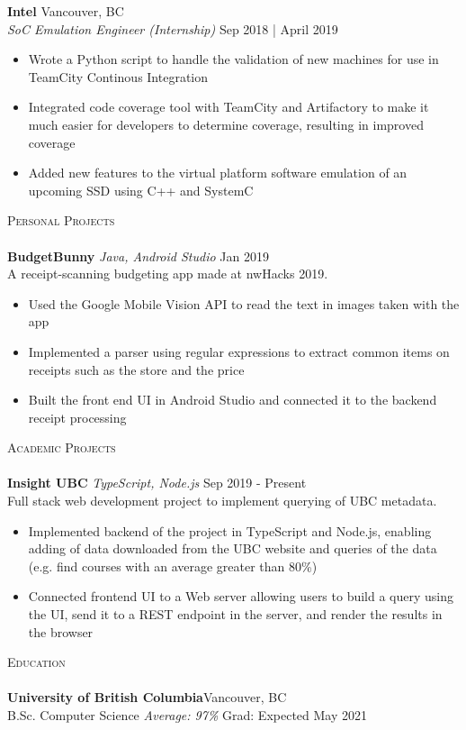 \documentclass[11pt, twoside]{article}
\newcommand{\lineunder} {
    \vspace*{-8pt} \\
    \hspace*{-18pt} \hrulefill \\
}
\newcommand{\header} [1] {
    {\hspace*{-18pt}\vspace*{6pt} \textsc{#1}}
    \vspace*{-6pt} \lineunder
}
\begin{document}
\textbf{Intel} \hfill Vancouver, BC\\
\textit{SoC Emulation Engineer (Internship)} \hfill Sep 2018 | April 2019\\
\vspace{-1mm}
\begin{itemize} \itemsep 1pt
	\item Wrote a Python script to handle the validation of new machines for use in TeamCity Continous Integration
	\item Integrated code coverage tool with TeamCity and Artifactory to make it much easier for developers to determine coverage, resulting in improved coverage
	\item Added new features to the virtual platform software emulation of an upcoming SSD using C++ and SystemC
\end{itemize}

\header{Personal Projects}
{\textbf{BudgetBunny} \sl Java, Android Studio}  \hfill Jan 2019 \\
 A receipt-scanning budgeting app made at nwHacks 2019. \\
\vspace{-5pt}
\begin{itemize} \itemsep 0pt
	\item Used the Google Mobile Vision API to read the text in images taken with the app
	\item Implemented a parser using regular expressions to extract common items on receipts such as the store and the price
	\item Built the front end UI in Android Studio and connected it to the backend receipt processing
\end{itemize}
\vspace*{2mm}

\header{Academic Projects}

{\textbf{Insight UBC} \sl TypeScript, Node.js}  \hfill Sep 2019 - Present\\
Full stack web development project to implement querying of UBC metadata.\\
\vspace{-5pt}
\begin{itemize} \itemsep 0pt
	\item Implemented backend of the project in TypeScript and Node.js, enabling adding of data downloaded from the UBC website and queries of the data (e.g. find courses with an average greater than 80\%) \\
    \item Connected frontend UI to a Web server allowing users to build a query using the UI, send it to a REST endpoint in the server, and render the results in the browser
\end{itemize}

\header{Education}
\textbf{University of British Columbia}\hfill Vancouver, BC\\
B.Sc. Computer Science \textit{Average: 97\%} \hfill Grad: Expected May 2021\\
\vspace{2mm}

\vspace*{2mm}
\ 
\end{document}

